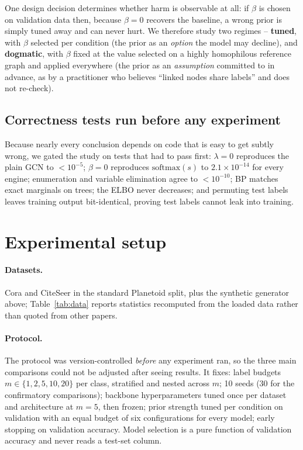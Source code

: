 \documentclass{article}
\begin{document}
One design decision determines whether harm is observable at all: if $\beta$ is chosen on
validation data then, because $\beta=0$ recovers the baseline, a wrong prior is simply tuned away
and can never hurt. We therefore study two regimes -- \textbf{tuned}, with $\beta$ selected per
condition (the prior as an \emph{option} the model may decline), and \textbf{dogmatic}, with
$\beta$ fixed at the value selected on a highly homophilous reference graph and applied
everywhere (the prior as an \emph{assumption} committed to in advance, as by a practitioner who
believes ``linked nodes share labels'' and does not re-check).

\subsection{Correctness tests run before any experiment}

Because nearly every conclusion depends on code that is easy to get subtly wrong, we gated the
study on tests that had to pass first: $\lambda=0$ reproduces the plain GCN to $<10^{-5}$;
$\beta=0$ reproduces $\mathrm{softmax}(s)$ to $2.1\times10^{-14}$ for every engine; enumeration
and variable elimination agree to $<10^{-10}$; BP matches exact marginals on trees; the ELBO never
decreases; and permuting test labels leaves training output bit-identical, proving test labels
cannot leak into training.

\section{Experimental setup}

\paragraph{Datasets.} Cora and CiteSeer \citep{sen2008collective,yang2016revisiting} in the
standard Planetoid split, plus the synthetic generator above; Table~\ref{tab:data} reports
statistics recomputed from the loaded data rather than quoted from other papers.

\paragraph{Protocol.} The protocol was version-controlled \emph{before} any experiment ran, so
the three main comparisons could not be adjusted after seeing results. It fixes: label budgets
$m\in\{1,2,5,10,20\}$ per class, stratified and nested across $m$; 10 seeds (30 for the
confirmatory comparisons); backbone hyperparameters tuned once per dataset and architecture at
$m=5$, then frozen; prior strength tuned per condition on validation with an equal budget of six
configurations for every model; early stopping on validation accuracy. Model selection is a pure
function of validation accuracy and never reads a test-set column.
\end{document}
